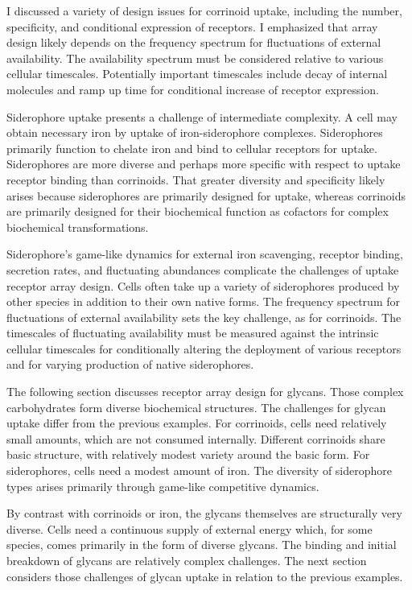 \documentclass[\mydocfontsize]{article}
\begin{document}
\begin{multicols}{2}
I discussed a variety of design issues for corrinoid uptake, including the number, specificity, and conditional expression of receptors. I emphasized that array design likely depends on the frequency spectrum for fluctuations of external availability. The availability spectrum must be considered relative to various cellular timescales. Potentially important timescales include decay of internal molecules and ramp up time for conditional increase of receptor expression.

Siderophore uptake presents a challenge of intermediate complexity. A cell may obtain necessary iron by uptake of iron-siderophore complexes. Siderophores primarily function to chelate iron and bind to cellular receptors for uptake. Siderophores are more diverse and perhaps more specific with respect to uptake receptor binding than corrinoids. That greater diversity and specificity likely arises because siderophores are primarily designed for uptake, whereas corrinoids are primarily designed for their biochemical function as cofactors for complex biochemical transformations. 

Siderophore's game-like dynamics for external iron scavenging, receptor binding, secretion rates, and fluctuating abundances complicate the challenges of uptake receptor array design. Cells often take up a variety of siderophores produced by other species in addition to their own native forms. The frequency spectrum for fluctuations of external availability sets the key challenge, as for corrinoids. The timescales of fluctuating availability must be measured against the intrinsic cellular timescales for conditionally altering the deployment of various receptors and for varying production of native siderophores. 

The following section discusses receptor array design for glycans. Those complex carbohydrates form diverse biochemical structures. The challenges for glycan uptake differ from the previous examples. For corrinoids, cells need relatively small amounts, which are not consumed internally. Different corrinoids share basic structure, with relatively modest variety around the basic form. For siderophores, cells need a modest amount of iron. The diversity of siderophore types arises primarily through game-like competitive dynamics. 

By contrast with corrinoids or iron, the glycans themselves are structurally very diverse. Cells need a continuous supply of external energy which, for some species, comes primarily in the form of diverse glycans. The binding and initial breakdown of glycans are relatively complex challenges. The next section considers those challenges of glycan uptake in relation to the previous examples.


\end{multicols}
\end{document}

